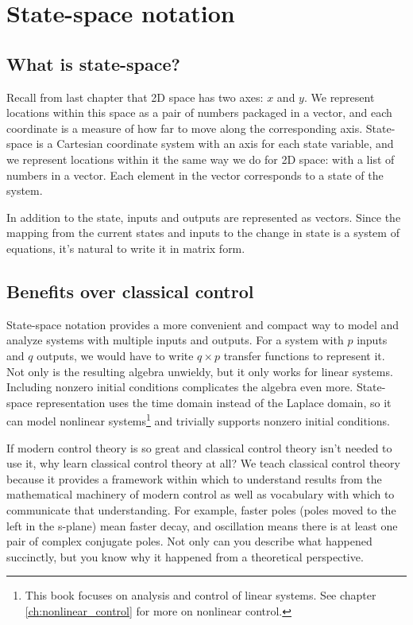 \section{State-space notation}

\subsection{What is state-space?}

Recall from last chapter that 2D space has two axes: $x$ and $y$. We represent
locations within this space as a pair of numbers packaged in a vector, and each
coordinate is a measure of how far to move along the corresponding axis.
State-space is a Cartesian coordinate system with an axis for each \gls{state}
variable, and we represent locations within it the same way we do for 2D space:
with a list of numbers in a vector. Each element in the vector corresponds to a
\gls{state} of the \gls{system}.

In addition to the \gls{state}, \glspl{input} and \glspl{output} are represented
as vectors. Since the mapping from the current \glspl{state} and \glspl{input}
to the change in \gls{state} is a system of equations, it's natural to write it
in matrix form.

\subsection{Benefits over classical control}

State-space notation provides a more convenient and compact way to model and
analyze \glspl{system} with multiple \glspl{input} and \glspl{output}. For a
\gls{system} with $p$ \glspl{input} and $q$ \glspl{output}, we would have to
write $q \times p$ transfer functions to represent it. Not only is the resulting
algebra unwieldy, but it only works for linear \glspl{system}. Including nonzero
initial conditions complicates the algebra even more. State-space representation
uses the time domain instead of the Laplace domain, so it can model nonlinear
\glspl{system}\footnote{This book focuses on analysis and control of linear
\glspl{system}. See chapter \ref{ch:nonlinear_control} for more on nonlinear
control.} and trivially supports nonzero initial conditions.

If modern control theory is so great and classical control theory isn't needed
to use it, why learn classical control theory at all? We teach classical control
theory because it provides a framework within which to understand results from
the mathematical machinery of modern control as well as vocabulary with which to
communicate that understanding. For example, faster poles (poles moved to the
left in the s-plane) mean faster decay, and oscillation means there is at least
one pair of complex conjugate poles. Not only can you describe what happened
succinctly, but you know why it happened from a theoretical perspective.

